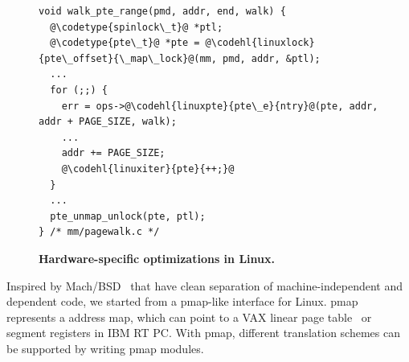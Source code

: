 \begin{figure}[H]
	\centering
\begin{singlespace}
\begin{verbatim}
void walk_pte_range(pmd, addr, end, walk) {
  @\codetype{spinlock\_t}@ *ptl;
  @\codetype{pte\_t}@ *pte = @\codehl{linuxlock}{pte\_offset}{\_map\_lock}@(mm, pmd, addr, &ptl);
  ...
  for (;;) {
    err = ops->@\codehl{linuxpte}{pte\_e}{ntry}@(pte, addr, addr + PAGE_SIZE, walk);
    ...
    addr += PAGE_SIZE;
    @\codehl{linuxiter}{pte}{++;}@
  }
  ...
  pte_unmap_unlock(pte, ptl);
} /* mm/pagewalk.c */
\end{verbatim}
\end{singlespace}


\caption{\bf Hardware-specific optimizations in Linux.}
\label{emt:fig:need:linux-performance-opt}
\end{figure}


Inspired by Mach/BSD~\cite{freebsd:pmap,cranor99uvm,rashid1987machine} 
	that have clean separation of machine-independent and dependent code,
	we started from a pmap-like interface for Linux.
pmap~\cite{rashid1987machine} represents a  
	address map, which 
	can point to a VAX linear page table~\cite{levy82virtual} 
	or segment registers in IBM RT PC.
With pmap, different translation schemes can be supported
	by writing %
	pmap modules.

